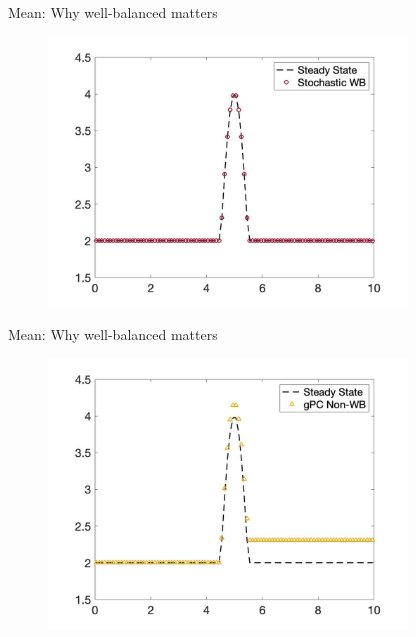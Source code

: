\documentclass[
    pdf,
    11pt,
    xcolor={svgnames},
  ]{beamer}
\begin{document}
\begin{frame}{Mean: Why well-balanced matters}
    \begin{figure}
    \centering
    \includegraphics[width=0.85\textwidth]{./Figures/burgers_wb_mean}
    \end{figure}
\end{frame}
\begin{frame}{Mean: Why well-balanced matters}
    \begin{figure}
    \centering
    \includegraphics[width=0.85\textwidth]{./Figures/burgers_non_mean}
    \end{figure}
\end{frame}
\end{document}
